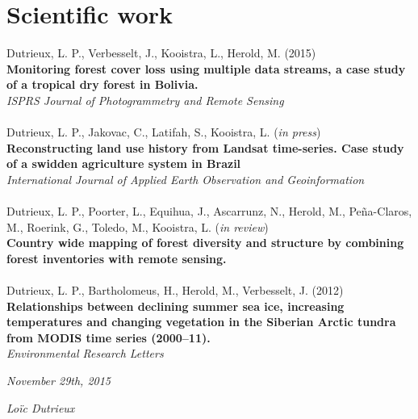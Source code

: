 \documentclass[]{friggeri-cv}
\begin{document}
\section{Scientific work}
    Dutrieux, L. P., Verbesselt, J., Kooistra, L., Herold, M. (2015)\\
    \textbf{Monitoring forest cover loss using multiple data streams, a case study of a tropical dry forest in Bolivia.}\\
    \textit{ISPRS Journal of Photogrammetry and Remote Sensing}\\
    \\
    Dutrieux, L. P., Jakovac, C., Latifah, S., Kooistra, L. (\textit{in press})\\
    \textbf{Reconstructing land use history from Landsat time-series. Case study of a swidden agriculture system in Brazil}\\
    \textit{International Journal of Applied Earth Observation and Geoinformation}\\
    \\
    Dutrieux, L. P., Poorter, L., Equihua, J., Ascarrunz, N., Herold, M., Pe\~{n}a-Claros, M., Roerink, G., Toledo, M., Kooistra, L. (\textit{in review})\\
    \textbf{Country wide mapping of forest diversity and structure by combining forest inventories with remote sensing.}\\
    \\
    Dutrieux, L. P., Bartholomeus, H., Herold, M., Verbesselt, J. (2012)\\
    \textbf{Relationships between declining summer sea ice, increasing temperatures and changing vegetation in the Siberian Arctic tundra from MODIS time series (2000–11).}\\
    \textit{Environmental Research Letters}\\


\begin{flushleft}
\emph{November 29th, 2015}
\end{flushleft}
\begin{flushright}
\emph{Lo\"{i}c Dutrieux}
\end{flushright}
\end{document}
